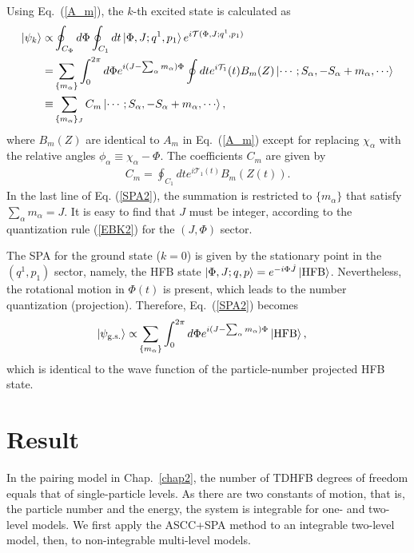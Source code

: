 \documentclass[11pt]{book} %
\begin{document}
Using Eq.~(\ref{A_m}),
the $k$-th excited state is calculated as
\begin{align}
\ket{\psi_k} \propto& \oint_{C_\Phi} d\Phi \oint_{C_1} dt
\ket{\Phi,J;q^1,p_1} e^{i\mathcal{T}(\Phi,J;q^1,p_1)}
 \nonumber \\
	=& \sum_{\{m_\alpha\}}
	\int_0^{2\pi} d\Phi e^{i(J-\sum_\alpha m_\alpha)\Phi} \oint dt e^{i\mathcal{T}_1}(t) B_m (Z) \ket{\cdots;S_\alpha,-S_\alpha+m_\alpha,\cdots} \nonumber \\
 \equiv& \sum_{\{m_\alpha\}_J} C_m \ket{\cdots;S_\alpha,-S_\alpha+m_\alpha,\cdots},
 \label{SPA2}
\end{align}
where $B_m(Z)$ are identical to $A_m$ in Eq.~(\ref{A_m}) except for
replacing $\chi_\alpha$ with the relative angles
$\phi_\alpha\equiv\chi_\alpha-\Phi$.
The coefficients $C_m$ are given by
\begin{align}
C_m = \oint_{C_1} dt e^{i\mathcal{T}_1(t)} B_m(Z(t)).
  \label{coef}
\end{align}
In the last line of Eq. (\ref{SPA2}), the summation is restricted to
$\{m_\alpha\}$ that satisfy $\sum_\alpha m_\alpha=J$.
It is easy to find that $J$ must be integer,
according to the quantization rule (\ref{EBK2}) for the $(J,\Phi)$ sector.

The SPA for the ground state ($k=0$) is given by the stationary point
in the $(q^1,p_1)$ sector,
namely, the HFB state $\ket{\Phi,J;q,p}=e^{-i\Phi\hat{J}}\ket{\rm HFB}$.
Nevertheless, the rotational motion in $\Phi(t)$ is present,
which leads to the number quantization (projection).
Therefore, Eq.~(\ref{SPA2}) becomes
\begin{align}
	\ket{\psi_{\rm g.s.}} \propto& \sum_{\{m_\alpha\}}
	\int_0^{2\pi} d\Phi e^{i(J-\sum_\alpha m_\alpha)\Phi}
	\ket{\rm HFB},  
	\label{SPA3}
\end{align}
which is identical to the wave function of the particle-number projected HFB state.


\section{Result}
\label{4-3}
In the pairing model in Chap.~\ref{chap2},
the number of TDHFB degrees of freedom equals that of single-particle levels.
As there are two constants of motion, that is, the particle number and 
the energy, the system is integrable for one- and two-level models.
We first apply the ASCC+SPA method to an integrable two-level model,
then, to non-integrable multi-level models.
\end{document}
